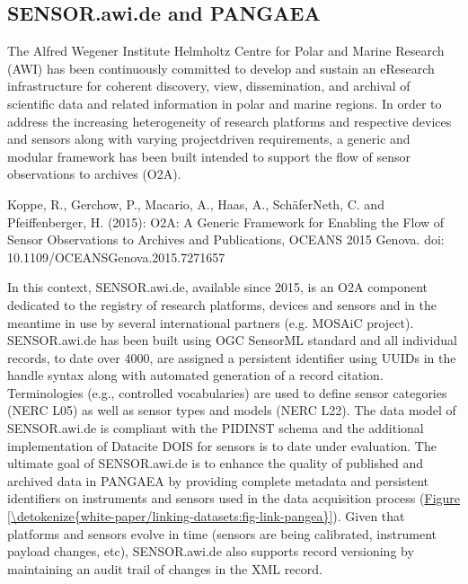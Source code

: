 \documentclass[a4paper,10pt,english]{sphinxmanual}
\begin{document}
\subsection{SENSOR.awi.de and PANGAEA}
\label{\detokenize{white-paper/adoption:sensor-awi-de-and-pangaea}}
\sphinxAtStartPar
The Alfred Wegener Institute Helmholtz Centre for Polar and Marine
Research (AWI) has been continuously committed to develop and sustain
an eResearch infrastructure for coherent discovery, view,
dissemination, and archival of scientific data and related information
in polar and marine regions.  In order to address the increasing
heterogeneity of research platforms and respective devices and sensors
along with varying project\sphinxhyphen{}driven requirements, a generic and modular
framework has been built intended to support the flow of sensor
observations to archives (O2A).%
\begin{footnote}[5]\sphinxAtStartFootnote
Koppe, R., Gerchow, P., Macario, A., Haas, A., Schäfer\sphinxhyphen{}Neth, C.
and Pfeiffenberger, H. (2015): O2A: A Generic Framework for Enabling
the Flow of Sensor Observations to Archives and Publications, OCEANS
2015 Genova. doi: 10.1109/OCEANS\sphinxhyphen{}Genova.2015.7271657
%
\end{footnote} In this context,
SENSOR.awi.de, available since 2015, is an O2A component dedicated to
the registry of research platforms, devices and sensors and in the
meantime in use by several international partners (e.g. MOSAiC
project).  SENSOR.awi.de has been built using OGC SensorML standard
and all individual records, to date over 4000, are assigned a
persistent identifier using UUIDs in the handle syntax along with
automated generation of a record citation.  Terminologies (e.g.,
controlled vocabularies) are used to define sensor categories (NERC
L05) as well as sensor types and models (NERC L22).  The data model of
SENSOR.awi.de is compliant with the PIDINST schema and the additional
implementation of Datacite DOIS for sensors is to date under
evaluation.  The ultimate goal of SENSOR.awi.de is to enhance the
quality of published and archived data in PANGAEA by providing
complete metadata and persistent identifiers on instruments and
sensors used in the data acquisition process
(\hyperref[\detokenize{white-paper/linking-datasets:fig-link-pangea}]{Figure \ref{\detokenize{white-paper/linking-datasets:fig-link-pangea}}}).  Given that platforms and sensors evolve
in time (sensors are being calibrated, instrument payload changes,
etc), SENSOR.awi.de also supports record versioning by maintaining an
audit trail of changes in the XML record.
\end{document}
